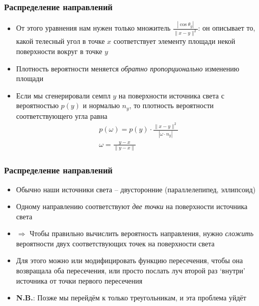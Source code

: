 \documentclass[10pt]{beamer}
\begin{document}
\begin{frame}
\frametitle{Распределение направлений}
\begin{itemize}
\item От этого уравнения нам нужен только множитель \begin{math}\frac{|\cos\theta_y|}{\|x-y\|^2}\end{math}: он описывает то, какой телесный угол в точке \begin{math}x\end{math} соответствует элементу площади некой поверхности вокруг в точке \begin{math}y\end{math}
\pause
\item Плотность вероятности меняется \textit{обратно пропорционально} изменению площади
\pause
\item Если мы сгенерировали семпл \begin{math}y\end{math} на поверхности источника света с вероятностью \begin{math}p(y)\end{math} и нормалью \begin{math}n_y\end{math}, то плотность вероятности соответствующего угла равна
\begin{gather*}
p(\omega) = p(y) \cdot \frac{\|x-y\|^2}{|\omega \cdot n_y|} \\
\omega = \frac{y-x}{\|y-x\|}
\end{gather*}
\end{itemize}
\end{frame}

\begin{frame}
\frametitle{Распределение направлений}
\begin{itemize}
\item Обычно наши источники света -- двусторонние (параллелепипед, эллипсоид)
\pause
\item Одному направлению соответствуют \textit{две точки} на поверхности источника света
\pause
\item \begin{math}\Longrightarrow\end{math} Чтобы правильно вычислить вероятность направления, нужно \textit{сложить} вероятности двух соответствующих точек на поверхности света
\pause
\item Для этого можно или модифицировать функцию пересечения, чтобы она возвращала оба пересечения, или просто послать луч второй раз `внутри' источника от точки первого пересечения
\pause
\item \alert{\textbf{N.B.}}: Позже мы перейдём к только треугольникам, и эта проблема уйдёт
\end{itemize}
\end{frame}
\end{document}
